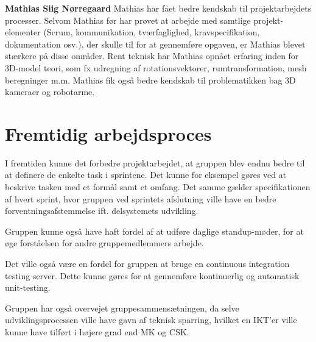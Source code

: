 \textbf{Mathias Siig Nørregaard}
Mathias har fået bedre kendskab til projektarbejdets processer. Selvom Mathias før har prøvet at arbejde med samtlige projekt-elementer (Scrum, kommunikation, tværfaglighed, kravspecifikation, dokumentation osv.), der skulle til for at gennemføre opgaven, er Mathias blevet stærkere på disse områder. Rent teknisk har Mathias opnået erfaring inden for 3D-model teori, som fx udregning af rotationsvektorer, rumtransformation, mesh beregninger m.m. Mathias fik også bedre kendskab til problematikken bag 3D kameraer og robotarme.

\section{Fremtidig arbejdsproces}
I fremtiden kunne det forbedre projektarbejdet, at gruppen blev endnu bedre til at definere de enkelte task i sprintene. Det kunne for eksempel gøres ved at beskrive tasken med et formål samt et omfang. Det samme gælder specifikationen af hvert sprint, hvor gruppen ved sprintets afslutning ville have en bedre forventningsafstemmelse ift. delsystemets udvikling.

Gruppen kunne også have haft fordel af at udføre daglige standup-møder, for at øge forståelsen for andre gruppemedlemmers arbejde.

Det ville også være en fordel for gruppen at bruge en continuous integration testing server. Dette kunne gøres for at gennemføre kontinuerlig og automatisk unit-testing.

Gruppen har også overvejet gruppesammensætningen, da selve udviklingsprocessen ville have gavn af teknisk sparring, hvilket en IKT'er ville kunne have tilført i højere grad end MK og CSK.